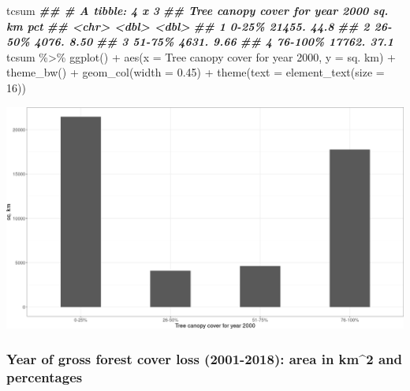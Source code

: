 \documentclass[10pt,landscape,a3paper]{article}
\newenvironment{Shaded}{\begin{snugshade}}{\end{snugshade}}
\newcommand{\AttributeTok}[1]{\textcolor[rgb]{0.77,0.63,0.00}{#1}}
\newcommand{\DecValTok}[1]{\textcolor[rgb]{0.00,0.00,0.81}{#1}}
\newcommand{\DocumentationTok}[1]{\textcolor[rgb]{0.56,0.35,0.01}{\textbf{\textit{#1}}}}
\newcommand{\FloatTok}[1]{\textcolor[rgb]{0.00,0.00,0.81}{#1}}
\newcommand{\FunctionTok}[1]{\textcolor[rgb]{0.00,0.00,0.00}{#1}}
\newcommand{\NormalTok}[1]{#1}
\newcommand{\SpecialCharTok}[1]{\textcolor[rgb]{0.00,0.00,0.00}{#1}}
\newcommand{\StringTok}[1]{\textcolor[rgb]{0.31,0.60,0.02}{#1}}
\begin{document}
\begin{Shaded}
\begin{Highlighting}[]
\NormalTok{tcsum}
\DocumentationTok{\#\# \# A tibble: 4 x 3}
\DocumentationTok{\#\#   \textasciigrave{}Tree canopy cover for year 2000\textasciigrave{} \textasciigrave{}sq. km\textasciigrave{}   pct}
\DocumentationTok{\#\#   \textless{}chr\textgreater{}                                \textless{}dbl\textgreater{} \textless{}dbl\textgreater{}}
\DocumentationTok{\#\# 1 0{-}25\%                               21455. 44.8 }
\DocumentationTok{\#\# 2 26{-}50\%                               4076.  8.50}
\DocumentationTok{\#\# 3 51{-}75\%                               4631.  9.66}
\DocumentationTok{\#\# 4 76{-}100\%                             17762. 37.1}
\NormalTok{tcsum }\SpecialCharTok{\%\textgreater{}\%}
  \FunctionTok{ggplot}\NormalTok{() }\SpecialCharTok{+} \FunctionTok{aes}\NormalTok{(}\AttributeTok{x =} \StringTok{\textasciigrave{}}\AttributeTok{Tree canopy cover for year 2000}\StringTok{\textasciigrave{}}\NormalTok{, }\AttributeTok{y =} \StringTok{\textasciigrave{}}\AttributeTok{sq. km}\StringTok{\textasciigrave{}}\NormalTok{) }\SpecialCharTok{+}
  \FunctionTok{theme\_bw}\NormalTok{() }\SpecialCharTok{+} \FunctionTok{geom\_col}\NormalTok{(}\AttributeTok{width =} \FloatTok{0.45}\NormalTok{) }\SpecialCharTok{+} \FunctionTok{theme}\NormalTok{(}\AttributeTok{text =} \FunctionTok{element\_text}\NormalTok{(}\AttributeTok{size =} \DecValTok{16}\NormalTok{))}
\end{Highlighting}
\end{Shaded}

\begin{center}\includegraphics[width=0.5\linewidth]{img/data-download-preparation-eda/tree-canopy-cover-2000-nationwide-by-year-1} \end{center}

\hypertarget{year-of-gross-forest-cover-loss-2001-2018-area-in-km2-and-percentages}{%
\subsubsection{Year of gross forest cover loss (2001-2018): area in
km\^{}2 and
percentages}\label{year-of-gross-forest-cover-loss-2001-2018-area-in-km2-and-percentages}}
\end{document}
